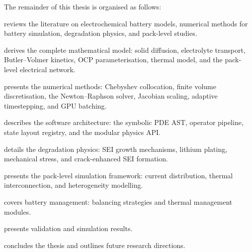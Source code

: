 The remainder of this thesis is organised as follows:

\begin{description}[leftmargin=2em]
  \item[Chapter~\ref{ch:literature}] reviews the literature on electrochemical battery models, numerical methods for battery simulation, degradation physics, and pack-level studies.

  \item[Chapter~\ref{ch:math_model}] derives the complete mathematical model: solid diffusion, electrolyte transport, Butler--Volmer kinetics, OCP parameterisation, thermal model, and the pack-level electrical network.

  \item[Chapter~\ref{ch:numerics}] presents the numerical methods: Chebyshev collocation, finite volume discretisation, the Newton--Raphson solver, Jacobian scaling, adaptive timestepping, and GPU batching.

  \item[Chapter~\ref{ch:software}] describes the software architecture: the symbolic PDE AST, operator pipeline, state layout registry, and the modular physics API.

  \item[Chapter~\ref{ch:degradation}] details the degradation physics: SEI growth mechanisms, lithium plating, mechanical stress, and crack-enhanced SEI formation.

  \item[Chapter~\ref{ch:pack}] presents the pack-level simulation framework: current distribution, thermal interconnection, and heterogeneity modelling.

  \item[Chapter~\ref{ch:control}] covers battery management: balancing strategies and thermal management modules.

  \item[Chapter~\ref{ch:results}] presents validation and simulation results.

  \item[Chapter~\ref{ch:conclusion}] concludes the thesis and outlines future research directions.
\end{description}
